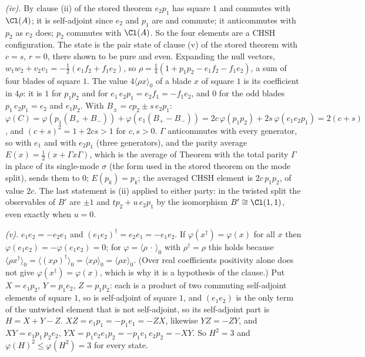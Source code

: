 \emph{(iv).} By clause (ii) of the stored theorem $e_{2}p_{1}$ has square $1$ and commutes with $\Cl(A)$; it is self-adjoint since $e_{2}$ and $p_{1}$ are and commute; it anticommutes with $p_{2}$ as $e_{2}$ does; $p_{2}$ commutes with $\Cl(A)$. So the four elements are a CHSH configuration. The state is the pair state of clause (v) of the stored theorem with $c = s$, $r = 0$, there shown to be pure and even. Expanding the null vectors, $w_{1}w_{2} + v_{2}v_{1} = -\tfrac12(e_{1}f_{2} + f_{1}e_{2})$, so $\rho = \tfrac14(1 + p_{1}p_{2} - e_{1}f_{2} - f_{1}e_{2})$, a sum of four blades of square $1$. The value $4\langle\rho x\rangle_{0}$ of a blade $x$ of square $1$ is its coefficient in $4\rho$: it is $1$ for $p_{1}p_{2}$ and for $e_{1}\,e_{2}p_{1} = e_{2}f_{1} = -f_{1}e_{2}$, and $0$ for the odd blades $p_{1}\,e_{2}p_{1} = e_{2}$ and $e_{1}p_{2}$. With $B_{\pm} = cp_{2} \pm s\,e_{2}p_{1}$: $\varphi(C) = \varphi(p_{1}(B_{+} + B_{-})) + \varphi(e_{1}(B_{+} - B_{-})) = 2c\,\varphi(p_{1}p_{2}) + 2s\,\varphi(e_{1}e_{2}p_{1}) = 2(c + s)$, and $(c + s)^{2} = 1 + 2cs > 1$ for $c, s > 0$. $\Gamma$ anticommutes with every generator, so with $e_{1}$ and with $e_{2}p_{1}$ (three generators), and the parity average $E(x) = \tfrac12(x + \Gamma x\Gamma)$, which is the average of Theorem  with the total parity $\Gamma$ in place of its single-mode $\sigma$ (the form used in the stored theorem on the mode split), sends them to $0$; $E(p_{k}) = p_{k}$; the averaged CHSH element is $2c\,p_{1}p_{2}$, of value $2c$. The last statement is (ii) applied to either party: in the twisted split the observables of $B'$ are $\pm 1$ and $tp_{2} + u\,e_{2}p_{1}$ by the isomorphism $B' \cong \Cl(1,1)$, even exactly when $u = 0$.

\emph{(v).} $e_{1}e_{2} = -e_{2}e_{1}$ and $(e_{1}e_{2})^{\dagger} = e_{2}e_{1} = -e_{1}e_{2}$. If $\varphi(x^{\dagger}) = \varphi(x)$ for all $x$ then $\varphi(e_{1}e_{2}) = -\varphi(e_{1}e_{2}) = 0$; for $\varphi = \langle\rho\,\cdot\,\rangle_{0}$ with $\rho^{\dagger} = \rho$ this holds because $\langle\rho x^{\dagger}\rangle_{0} = \langle(x\rho)^{\dagger}\rangle_{0} = \langle x\rho\rangle_{0} = \langle\rho x\rangle_{0}$. (Over real coefficients positivity alone does not give $\varphi(x^{\dagger}) = \varphi(x)$, which is why it is a hypothesis of the clause.) Put $X = e_{1}p_{2}$, $Y = p_{1}e_{2}$, $Z = p_{1}p_{2}$: each is a product of two commuting self-adjoint elements of square $1$, so is self-adjoint of square $1$, and $(e_{1}e_{2})$ is the only term of the untwisted element that is not self-adjoint, so its self-adjoint part is $H = X + Y - Z$. $XZ = e_{1}p_{1} = -p_{1}e_{1} = -ZX$, likewise $YZ = -ZY$, and $XY = e_{1}p_{1}\,p_{2}e_{2}$, $YX = p_{1}e_{2}e_{1}p_{2} = -p_{1}e_{1}\,e_{2}p_{2} = -XY$. So $H^{2} = 3$ and $\varphi(H)^{2} \le \varphi(H^{2}) = 3$ for every state.
